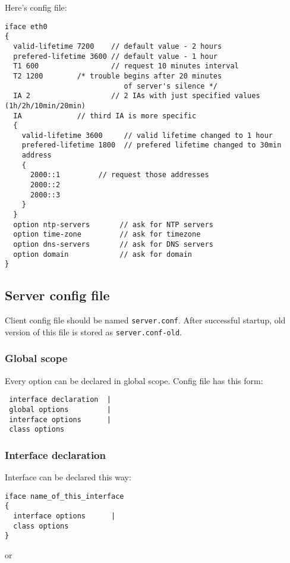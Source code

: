Here's config file:

\begin{verbatim}
iface eth0
{
  valid-lifetime 7200    // default value - 2 hours
  prefered-lifetime 3600 // default value - 1 hour
  T1 600                 // request 10 minutes interval
  T2 1200		 /* trouble begins after 20 minutes
                            of server's silence */
  IA 2                   // 2 IAs with just specified values (1h/2h/10min/20min)
  IA			 // third IA is more specific
  {
    valid-lifetime 3600   	// valid lifetime changed to 1 hour
    prefered-lifetime 1800	// prefered lifetime changed to 30min
    address
    {			  
      2000::1		  // request those addresses
      2000::2             
      2000::3
    }
  }
  option ntp-servers       // ask for NTP servers
  option time-zone         // ask for timezone
  option dns-servers       // ask for DNS servers
  option domain            // ask for domain
}
\end{verbatim}

\subsection{Server config file}

Client config file should be named \verb+server.conf+. After
successful startup, old version of this file is stored as \verb+server.conf-old+.

\subsubsection{Global scope}

Every option can be declared in global scope.
Config file has this form:

\begin{verbatim}
 interface declaration  |
 global options         |
 interface options      |
 class options          
\end{verbatim}

\subsubsection{Interface declaration}

Interface can be declared this way:
\begin{verbatim}
iface name_of_this_interface
{
  interface options      |
  class options        
}
\end{verbatim}

or 

